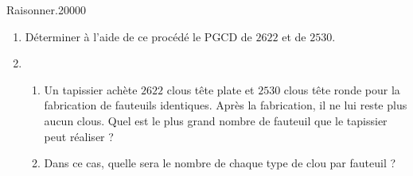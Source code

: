 \begin{pageAuto}
\begin{ExoAutoN}{Raisonner.}{2}{0}{0}{0}{0}
\begin{enumerate}[leftmargin=*]

\item Déterminer à l'aide de ce procédé le PGCD de $2 622$ et de $2 530$. 
\item 
\begin{enumerate}[leftmargin=*]
\item Un tapissier achète $2 622$ clous tête plate et $2 530$ clous tête ronde pour la fabrication de fauteuils identiques. Après la fabrication, il ne lui reste plus aucun clous. Quel est le plus grand nombre de fauteuil que le tapissier peut réaliser ? 
\item Dans ce cas, quelle sera le nombre de chaque type de clou par fauteuil ? 
\end{enumerate}
\end{enumerate}
\end{ExoAutoN}

\end{pageAuto}
